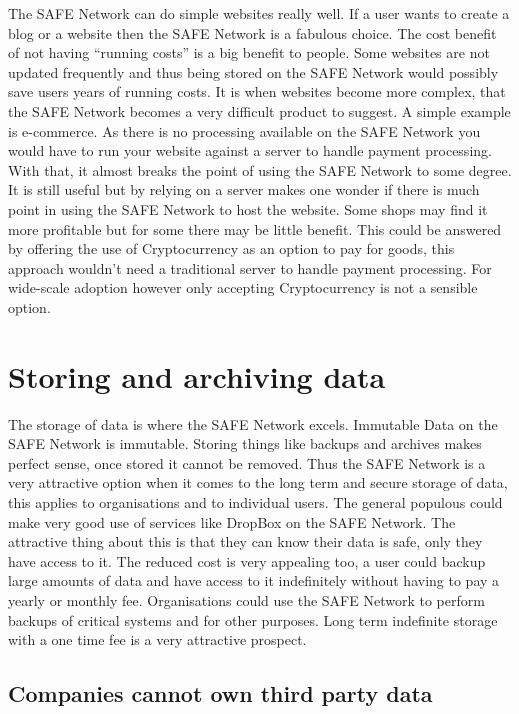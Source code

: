 The SAFE Network can do simple websites really well. If a user wants to create a blog or a website then the SAFE Network is a fabulous choice. The cost benefit of not having ``running costs'' is a big benefit to people. Some websites are not updated frequently and thus being stored on the SAFE Network would possibly save users years of running costs. It is when websites become more complex, that the SAFE Network becomes a very difficult product to suggest. A simple example is e-commerce. As there is no processing available on the SAFE Network you would have to run your website against a server to handle payment processing. With that, it almost breaks the point of using the SAFE Network to some degree. It is still useful but by relying on a server makes one wonder if there is much point in using the SAFE Network to host the website. Some shops may find it more profitable but for some there may be little benefit. This could be answered by offering the use of Cryptocurrency as an option to pay for goods, this approach wouldn't need a traditional server to handle payment processing. For wide-scale adoption however only accepting Cryptocurrency is not a sensible option.

\section{Storing and archiving data}

The storage of data is where the SAFE Network excels. Immutable Data on the SAFE Network is immutable. Storing things like backups and archives makes perfect sense, once stored it cannot be removed. Thus the SAFE Network is a very attractive option when it comes to the long term and secure storage of data, this applies to organisations and to individual users. The general populous could make very good use of services like DropBox on the SAFE Network. The attractive thing about this is that they can know their data is safe, only they have access to it. The reduced cost is very appealing too, a user could backup large amounts of data and have access to it indefinitely without having to pay a yearly or monthly fee. Organisations could use the SAFE Network to perform backups of critical systems and for other purposes. Long term indefinite storage with a one time fee is a very attractive prospect.

\subsection{Companies cannot own third party data}

